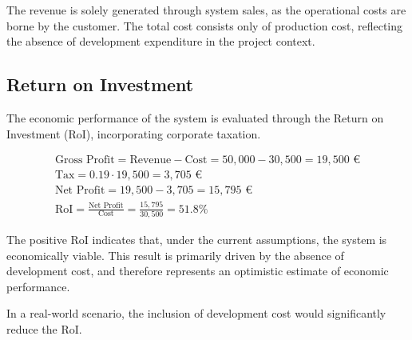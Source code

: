 The revenue is solely generated through system sales, as the operational costs are borne by the customer. The total cost consists only of production cost, reflecting the absence of development expenditure in the project context.

\vspace{-15pt}
\subsection{Return on Investment}

The economic performance of the system is evaluated through the Return on Investment (RoI), incorporating corporate taxation.

\begingroup
\setlength{\jot}{4pt} %
\begin{gather}
    \text{Gross Profit} = \text{Revenue} - \text{Cost}= 50{,}000 - 30{,}500 = 19{,}500 \text{ €} \\
    \text{Tax} = 0.19 \cdot 19{,}500 = 3{,}705 \text{ €} \\
    \text{Net Profit} = 19{,}500 - 3{,}705 = 15{,}795 \text{ €} \\
    \text{RoI} = \frac{\text{Net Profit}}{\text{Cost}} = \frac{15{,}795}{30{,}500} = 51.8\%
\end{gather}
\endgroup

The positive RoI indicates that, under the current assumptions, the system is economically viable. This result is primarily driven by the absence of development cost, and therefore represents an optimistic estimate of economic performance.

In a real-world scenario, the inclusion of development cost would significantly reduce the RoI.

